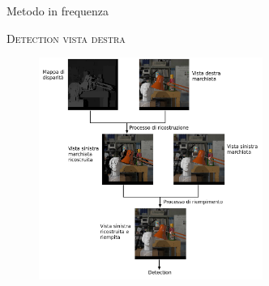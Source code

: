 \documentclass{beamer}
\begin{document}
\begin{section}{Metodo in frequenza}
\begin{frame}[t]{\textsc{Detection vista destra}}
\begin{figure}
  \includegraphics[width=0.65\textwidth]{./img_wat/detection_workflow.png}  
  \label{fig:rightdetflow}
\end{figure}
\end{frame}

\end{section}
\end{document}
